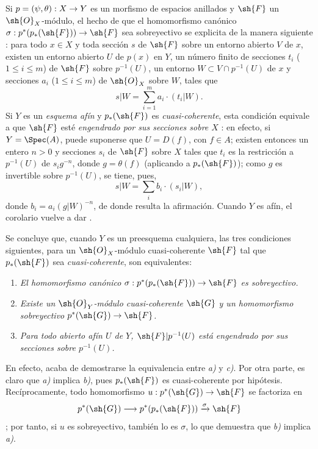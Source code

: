 \documentclass[oneside,10pt]{amsart}
\makeatletter
\renewcommand{\leq}{\leqslant}
\newcommand{\ega@arrow}[2]{\mathchoice{#1}{#2}{#2}{#2}}
\renewcommand{\to}{\ega@arrow{\longrightarrow}{\rightarrow}}
\newcommand{\oldpage}[2][]{\marginnote{\normalfont\footnotesize\textbf{#1}~|~#2}\ignorespaces}
\let\EGAOriginalLabel\label
\renewcommand{\label}[1]{\phantomsection\EGAOriginalLabel{#1}}
\makeatother
\begin{document}
\begin{remarks}[3.4.7]
\label{II.3.4.7}
Si $p=(\psi,\theta):X\to Y$ es un morfismo de espacios anillados y $\sh{F}$ un $\sh{O}_X$-módulo, el hecho de que el homomorfismo canónico $\sigma:p^*(p_*(\sh{F}))\to\sh{F}$ sea sobreyectivo se explicita de la manera siguiente : para todo $x\in X$ y toda sección $s$ de $\sh{F}$ sobre un entorno abierto $V$ de $x$, existen un entorno abierto $U$ de $p(x)$ en $Y$, un número finito de secciones $t_i$ ($1\leq i\leq m$) de $\sh{F}$ sobre $p^{-1}(U)$, un entorno $W\subset V\cap p^{-1}(U)$ de $x$ y secciones $a_i$ ($1\leq i\leq m$) de $\sh{O}_X$ sobre $W$, tales que
\[
  s|W=\sum_{i=1}^m a_i\cdot(t_i|W).
\]
Si $Y$ es un \emph{esquema afín} y $p_*(\sh{F})$ es \emph{cuasi-coherente}, esta condición equivale a que $\sh{F}$ esté \emph{engendrado por sus secciones sobre $X$} : en efecto, si $Y=\Spec(A)$, puede suponerse que $U=D(f)$, con $f\in A$; existen entonces un entero $n>0$ y secciones $s_i$ de $\sh{F}$ sobre $X$ tales que $t_i$ es la restricción a $p^{-1}(U)$ de $s_ig^{-n}$, donde $g=\theta(f)$ (aplicando  a $p_*(\sh{F})$); como $g$ es invertible sobre $p^{-1}(U)$, se tiene, pues,
\[
  s|W=\sum_i b_i\cdot(s_i|W),
\]
donde $b_i=a_i(g|W)^{-n}$, de donde resulta la afirmación.
Cuando $Y$ es afín, el corolario  vuelve a dar .

\oldpage[II]{61}
Se concluye que, cuando $Y$ es un preesquema cualquiera, las tres condiciones siguientes, para un $\sh{O}_X$-módulo cuasi-coherente $\sh{F}$ tal que $p_*(\sh{F})$ sea \emph{cuasi-coherente}, son equivalentes:
\begin{enumerate}
  \item[a)] \emph{El homomorfismo canónico $\sigma:p^*(p_*(\sh{F}))\to\sh{F}$ es sobreyectivo.}
  \item[b)] \emph{Existe un $\sh{O}_Y$-módulo cuasi-coherente $\sh{G}$ y un homomorfismo sobreyectivo $p^*(\sh{G})\to\sh{F}$.}
  \item[c)] \emph{Para todo abierto afín $U$ de $Y$, $\sh{F}|p^{-1}(U)$ está engendrado por sus secciones sobre $p^{-1}(U)$.}
\end{enumerate}

En efecto, acaba de demostrarse la equivalencia entre \emph{a)} y \emph{c)}.
Por otra parte, es claro que \emph{a)} implica \emph{b)}, pues $p_*(\sh{F})$ es cuasi-coherente por hipótesis.
Recíprocamente, todo homomorfismo $u:p^*(\sh{G})\to\sh{F}$ se factoriza en
\[
  p^*(\sh{G})\to p^*(p_*(\sh{F}))\xrightarrow{\sigma}\sh{F}
\]
; por tanto, si $u$ es sobreyectivo, también lo es $\sigma$, lo que demuestra que \emph{b)} implica \emph{a)}.
\end{remarks}
\end{document}
